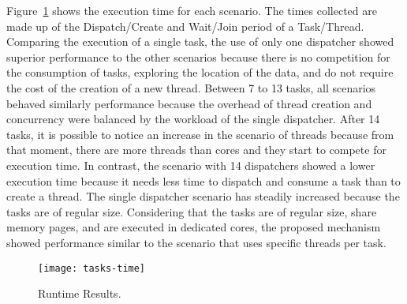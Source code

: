 	Figure~\ref{fig:time} shows the execution time for each scenario. The times
	collected are made up of the Dispatch/Create and Wait/Join period of
	a Task/Thread.  Comparing the execution of a single task, the use of only
	one dispatcher showed superior performance to the other scenarios because
	there is no competition for the consumption of tasks, exploring the
	location of the data, and do not require the cost of the creation of a new
	thread. Between	7 to 13 tasks, all scenarios behaved similarly performance
	because the overhead of thread creation and concurrency were balanced by
	the workload of the single dispatcher. After 14 tasks, it is possible to
	notice an increase in the scenario of threads because from that moment,
	there are more threads than cores and they start to compete for execution
	time. In contrast, the scenario with 14 dispatchers showed a lower
	execution time because it needs less time to dispatch and consume a task
	than to create a thread. The single dispatcher scenario has steadily
	increased because the tasks are of regular size. Considering that the tasks
	are of regular size, share memory pages, and are executed in dedicated
	cores, the proposed mechanism showed performance similar to the scenario
	that uses specific threads per task.

	\begin{figure}[]
			\centering
			\texttt{[image: tasks-time]}
			\caption{Runtime Results.}
			\label{fig:time}
	\end{figure}

